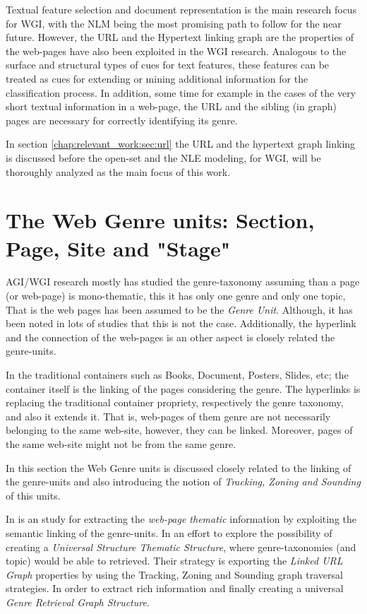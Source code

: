 Textual feature selection and document representation is the main research focus for WGI, with the NLM being the most promising path to follow for the near future. However, the URL and the Hypertext linking graph are the properties of the web-pages have also been exploited in the WGI research.  Analogous to the surface and structural types of cues for text features, these features can be treated as cues for extending or mining additional information for the classification process. In addition, some time for example in the cases of the very short textual information in a web-page, the URL and the sibling (in graph) pages are necessary for correctly identifying its genre. 

In section \ref{chap:relevant_work:sec:url} the URL and the hypertext graph linking is discussed before the open-set and the NLE modeling, for WGI, will be thoroughly analyzed as the main focus of this work.

\section{The Web Genre units: Section, Page, Site and "Stage"}

AGI/WGI research mostly has studied the genre-taxonomy assuming than a page (or web-page) is mono-thematic, this it has only one genre and only one topic, That is the web pages has been assumed to be the \textit{Genre Unit}. Although, it has been noted in lots of studies that this is not the case. Additionally, the hyperlink and the connection of the web-pages is an other aspect is closely related the genre-units. 

In the  traditional containers such as Books, Document, Posters, Slides, etc; the container itself is the linking of the pages considering the genre. The hyperlinks is replacing the traditional container propriety, respectively the genre taxonomy, and also it extends it. That is, web-pages of them genre are not necessarily belonging to the same web-site, however, they can be linked. Moreover, pages of the same web-site might not be from the same genre. 

In this section the Web Genre units is discussed closely related to the linking of the genre-units and also introducing the notion of \textit{Tracking, Zoning and Sounding} of this units. 

In \parencite{mehler2011integrating} is an study for extracting the \textit{web-page thematic} information by exploiting the semantic linking of the genre-units. In an effort to explore the possibility of creating a \textit{Universal Structure Thematic Structure}, where genre-taxonomies (and topic) would be able to retrieved. Their strategy is exporting the \textit{Linked URL Graph} properties by using the Tracking, Zoning and Sounding graph traversal strategies. In order to extract rich information and finally creating a universal \textit{Genre Retrieval Graph Structure}.


